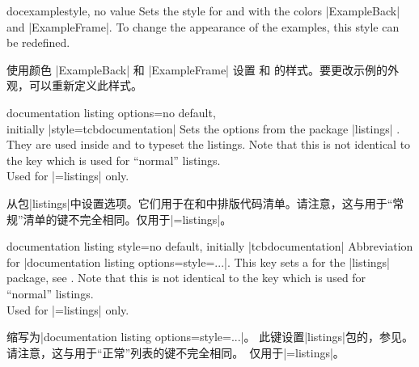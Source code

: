 \begin{docTcbKey}[][doc updated=2015-03-16]{docexample}{}{style, no value}
Sets the style for  and 
with the colors |ExampleBack| and |ExampleFrame|.
To change the appearance of the examples, this style can be
redefined.

使用颜色 |ExampleBack| 和 |ExampleFrame| 设置  和  的样式。要更改示例的外观，可以重新定义此样式。
\begin{dispListing}
\end{dispListing}
\end{docTcbKey}

\begin{docTcbKey}{documentation listing options}{=}{no default,\\\hspace*{\fill} initially |style=tcbdocumentation|}
Sets the options from the package |listings| \cite{hoffmann:listings}.
They are used inside  and  to typeset
the listings. Note that this is not identical to the key
 which is used for \enquote{normal} listings.\\
Used for |=listings| only.

从包|listings|\cite{hoffmann:listings}中设置选项。它们用于在和中排版代码清单。请注意，这与用于“常规”清单的键不完全相同。仅用于|=listings|。
\end{docTcbKey}

\begin{docTcbKey}{documentation listing style}{=}{no default, initially |tcbdocumentation|}
Abbreviation for |documentation listing options={style=...}|.
This key sets a 
for the |listings| package, see \cite{hoffmann:listings}.
Note that this is not identical to the key
 which is used for \enquote{normal} listings.\\
Used for |=listings| only.

缩写为|documentation listing options={style=...}|。 此键设置|listings|包的，参见\cite{hoffmann:listings}。 请注意，这与用于“正常”列表的键不完全相同。\ 仅用于|=listings|。
\end{docTcbKey}

